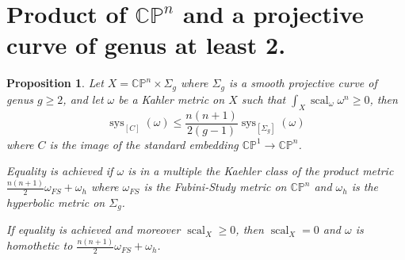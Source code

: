 \documentclass{amsart}
\newtheorem{proposition}[theorem]{Proposition}
\numberwithin{equation}{section}
\theoremstyle {definition}
\DeclareMathOperator{\scal}{scal}
\DeclareMathOperator{\sys}{sys}
\begin{document}
\section{Product of $\mathbb{CP}^n$ and a projective curve of genus at least 2.}

\begin{proposition}
    Let $X=\mathbb{CP}^n\times \Sigma_g$ where $\Sigma_g$ is a smooth projective curve of genus $g\geq 2$, and let $\omega$ be a Kahler metric on $X$ such that $\int_X\scal_\omega\omega^n\geq 0$, then \[\sys_{[C]}(\omega)\leq \frac{n(n+1)}{2(g-1)}\sys_{[\Sigma_g]}(\omega)\] where $C$ is the image of the standard embedding $\mathbb{CP}^1\to\mathbb{CP}^n$.

    Equality is achieved if $\omega$ is in a multiple the Kaehler class of the product metric $\frac{n(n+1)}{2}\omega_{FS}+\omega_h$ where $\omega_{FS}$ is the Fubini-Study metric on $\mathbb{CP}^n$ and $\omega_h$ is the hyperbolic metric on $\Sigma_g$.

    If equality is achieved and moreover $\scal_X\geq 0$, then $\scal_X=0$ and $\omega$ is homothetic to $\frac{n(n+1)}{2}\omega_{FS}+\omega_h$.
\end{proposition}
\end{document}
